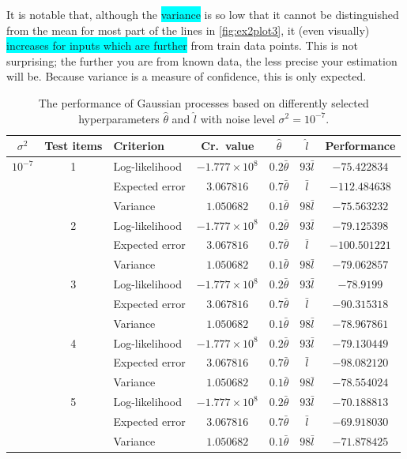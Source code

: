 \documentclass[a4paper,11pt]{article}
\newcommand{\hl}[1]{\colorbox{cyan}{#1}}
\begin{document}
It is notable that, although the \hl{variance} is so low that it cannot be distinguished from the mean for most part of the lines in \autoref{fig:ex2plot3}, it (even visually) \hl{increases for inputs which are further} from train data points.  This is not surprising; the further you are from known data, the less precise your estimation will be.  Because variance is a measure of confidence, this is only expected.

\begin{table}
  \caption{The performance of Gaussian processes based on differently selected hyperparameters $\hat\theta$ and $\hat l$ with noise level $\sigma^2=10^{-7}$.}
  \label{tab:s7}
  \begin{tabular}{cclcccc}
    \hline
    $\sigma^2$ & Test items & Criterion & Cr.\ value & $\hat\theta$ & $\hat l$ & Performance \\
    \hline
    \hline
    $10^{-7}$ & 1 & Log-likelihood & $-1.777 \times 10^8$ & $0.2\bar\theta$ & $93 \bar l$ & $-75.422834$ \\
              &   & Expected error & $3.067816$ & $0.7\bar\theta$ & $\bar l$ & $-112.484638$ \\
              &   & Variance & $1.050682$ & $0.1\bar\theta$ & $98\bar l$ & $-75.563232$ \\
    \hline
              & 2 & Log-likelihood & $-1.777 \times 10^8$ & $0.2\bar\theta$ & $93 \bar l$ & $-79.125398$ \\
              &   & Expected error & $3.067816$ & $0.7\bar\theta$ & $\bar l$ & $-100.501221$ \\
              &   & Variance & $1.050682$ & $0.1\bar\theta$ & $98\bar l$ & $-79.062857$ \\
    \hline
              & 3 & Log-likelihood & $-1.777 \times 10^8$ & $0.2\bar\theta$ & $93 \bar l$ & $-78.9199$ \\
              &   & Expected error & $3.067816$ & $0.7\bar\theta$ & $\bar l$ & $-90.315318$ \\
              &   & Variance & $1.050682$ & $0.1\bar\theta$ & $98\bar l$ & $-78.967861$ \\
    \hline
              & 4 & Log-likelihood & $-1.777 \times 10^8$ & $0.2\bar\theta$ & $93 \bar l$ & $-79.130449$ \\
              &   & Expected error & $3.067816$ & $0.7\bar\theta$ & $\bar l$ & $-98.082120$ \\
              &   & Variance & $1.050682$ & $0.1\bar\theta$ & $98\bar l$ & $-78.554024$ \\
    \hline
              & 5 & Log-likelihood & $-1.777 \times 10^8$ & $0.2\bar\theta$ & $93 \bar l$ & $-70.188813$ \\
              &   & Expected error & $3.067816$ & $0.7\bar\theta$ & $\bar l$ & $-69.918030$ \\
              &   & Variance & $1.050682$ & $0.1\bar\theta$ & $98\bar l$ & $-71.878425$ \\
    \hline
  \end{tabular}
\end{table}
\end{document}
